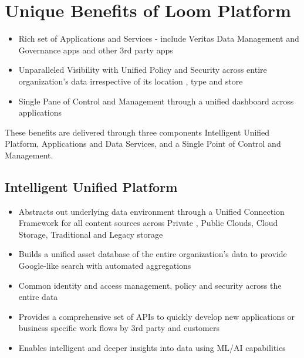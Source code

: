 \documentclass[letterpaper,10pt,english]{sphinxhowto}
\begin{document}
\section{Unique Benefits of Loom Platform}
\label{\detokenize{col/ds/mcdmp_ds_alpha1:mcdmp-ds-alpha}}\label{\detokenize{col/ds/mcdmp_ds_alpha1:unique-benefits-of-loom-platform}}\label{\detokenize{col/ds/mcdmp_ds_alpha1:loom-alpha1-datasheet}}\begin{itemize}
\item {} 
Rich set of Applications and Services - include Veritas Data Management and Governance apps and other 3rd party apps

\item {} 
Unparalleled Visibility with Unified Policy and Security across entire organization’s data irrespective of its location  , type and store

\item {} 
Single Pane of Control and Management through a unified dashboard across applications

\end{itemize}

These benefits are delivered through three components \textendash{} Intelligent Unified Platform, Applications and Data Services, and a Single Point of Control and Management.


\subsection{Intelligent Unified Platform}
\label{\detokenize{col/ds/mcdmp_ds_alpha1:intelligent-unified-platform}}\begin{itemize}
\item {} 
Abstracts out underlying data environment through a Unified Connection Framework for all content sources
across Private  , Public Clouds, Cloud Storage, Traditional and Legacy storage

\item {} 
Builds a unified asset database of the entire organization’s data to provide Google-like search with
automated aggregations

\item {} 
Common identity and access management, policy and security across the entire data

\item {} 
Provides a comprehensive set of APIs to quickly develop new applications or business specific work flows by
3rd party and customers

\item {} 
Enables intelligent and deeper insights into data using ML/AI capabilities

\end{itemize}
\end{document}

